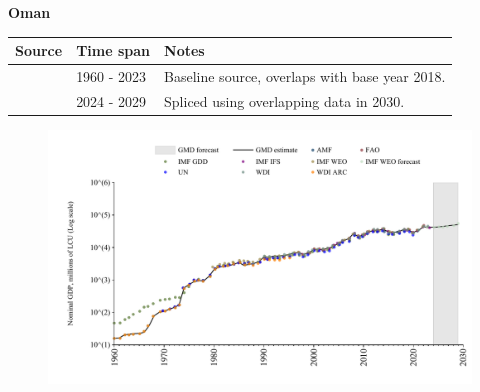 \documentclass[12pt,a4paper,landscape]{article}
\begin{document}
\begin{adjustbox}{max totalsize={\paperwidth}{\paperheight},center}
\begin{minipage}[t][\textheight][t]{\textwidth}
\vspace*{0.5cm}
{}
\begin{center}
{\Large\bfseries Oman}
\end{center}
\vspace{0.5cm}
\begin{table}[H]
\centering
\small
\begin{tabular}{|l|l|l|}
\hline
\textbf{Source} & \textbf{Time span} & \textbf{Notes} \\
\hline
\rowcolor{white}\cite{WDI}& 1960 - 2023 &Baseline source, overlaps with base year 2018.\\
\rowcolor{lightgray}\cite{IMF_WEO_forecast}& 2024 - 2029 &Spliced using overlapping data in 2030.\\
\hline
\end{tabular}
\end{table}
\begin{figure}[H]
\centering
\includegraphics[width=\textwidth,height=0.6\textheight,keepaspectratio]{graphs/OMN_nGDP.pdf}
\end{figure}
\end{minipage}
\end{adjustbox}
\end{document}
